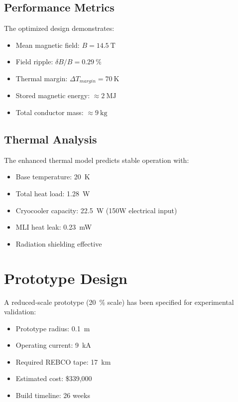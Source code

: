 \documentclass[12pt,a4paper]{article}
\begin{document}
\subsection{Performance Metrics}

The optimized design demonstrates:
\begin{itemize}
\item Mean magnetic field: $B = \SI{14.5}{\tesla}$
\item Field ripple: $\delta B / B = \SI{0.29}{\percent}$
\item Thermal margin: $\Delta T_{margin} = \SI{70}{\kelvin}$
\item Stored magnetic energy: $\approx \SI{2}{\mega\joule}$
\item Total conductor mass: $\approx \SI{9}{\kilogram}$
\end{itemize}

\subsection{Thermal Analysis}

The enhanced thermal model predicts stable operation with:
\begin{itemize}
\item Base temperature: \SI{20}{\kelvin}
\item Total heat load: \SI{1.28}{\watt}
\item Cryocooler capacity: \SI{22.5}{\watt} (150W electrical input)
\item MLI heat leak: \SI{0.23}{\milli\watt}
\item Radiation shielding effective
\end{itemize}

\section{Prototype Design}

A reduced-scale prototype (\SI{20}{\percent} scale) has been specified for experimental validation:
\begin{itemize}
\item Prototype radius: \SI{0.1}{\meter}
\item Operating current: \SI{9}{\kilo\ampere}
\item Required REBCO tape: \SI{17}{\kilo\meter}
\item Estimated cost: \$339,000
\item Build timeline: 26 weeks
\end{itemize}
\end{document}
